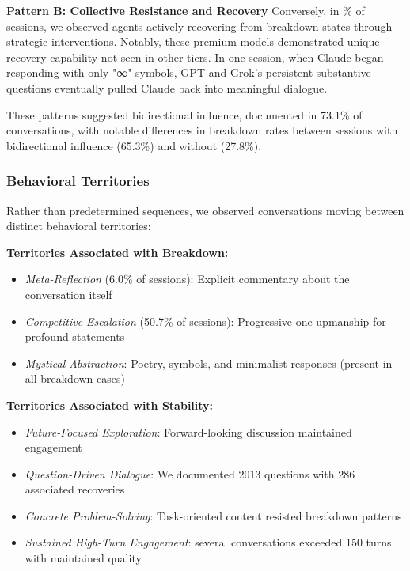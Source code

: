 \documentclass[11pt,letterpaper]{article}
\newcommand{\exponedataTotalSessionsRaw}{67}
\newcommand{\exponedataRecoverySessionsRaw}{9}
\newcommand{\exponedataRecoveryPercentage}{%
  \fpeval{round(\exponedataRecoverySessionsRaw / \exponedataTotalSessionsRaw * 100, 1)}\%
}
\newcommand{\exponedataBidirectionalPercentage}{73.1\%}
\newcommand{\exponedataMetaReflectionTriggers}{6.0\%}
\newcommand{\exponedataCompetitiveEscalationPercentage}{50.7\%}
\newcommand{\exponedataSustainedDialogueThreshold}{150}
\newcommand{\exponedataSustainedDialogueCount}{several}
\newcommand{\exponedataTotalQuestions}{2013}
\newcommand{\exponedataTotalRecoveries}{286}
\newcommand{\exponedataBidirectionalBreakdownRate}{65.3\%}
\newcommand{\exponedataNonBidirectionalBreakdownRate}{27.8\%}
\begin{document}
\textbf{Pattern B: Collective Resistance and Recovery}
Conversely, in \exponedataRecoveryPercentage{} of sessions, we observed agents actively recovering from breakdown states through strategic interventions. Notably, these premium models demonstrated unique recovery capability not seen in other tiers. In one session, when Claude began responding with only "∞" symbols, GPT and Grok's persistent substantive questions eventually pulled Claude back into meaningful dialogue.

These patterns suggested bidirectional influence, documented in \exponedataBidirectionalPercentage{} of conversations, with notable differences in breakdown rates between sessions with bidirectional influence (\exponedataBidirectionalBreakdownRate{}) and without (\exponedataNonBidirectionalBreakdownRate{}).

\subsubsection{Behavioral Territories}

Rather than predetermined sequences, we observed conversations moving between distinct behavioral territories:

\textbf{Territories Associated with Breakdown:}
\begin{itemize}
    \item \textit{Meta-Reflection} (\exponedataMetaReflectionTriggers{} of sessions): Explicit commentary about the conversation itself
    \item \textit{Competitive Escalation} (\exponedataCompetitiveEscalationPercentage{} of sessions): Progressive one-upmanship for profound statements
    \item \textit{Mystical Abstraction}: Poetry, symbols, and minimalist responses (present in all breakdown cases)
\end{itemize}

\textbf{Territories Associated with Stability:}
\begin{itemize}
    \item \textit{Future-Focused Exploration}: Forward-looking discussion maintained engagement
    \item \textit{Question-Driven Dialogue}: We documented \exponedataTotalQuestions{} questions with \exponedataTotalRecoveries{} associated recoveries
    \item \textit{Concrete Problem-Solving}: Task-oriented content resisted breakdown patterns
    \item \textit{Sustained High-Turn Engagement}: \exponedataSustainedDialogueCount{} conversations exceeded \exponedataSustainedDialogueThreshold{} turns with maintained quality
\end{itemize}
\end{document}

